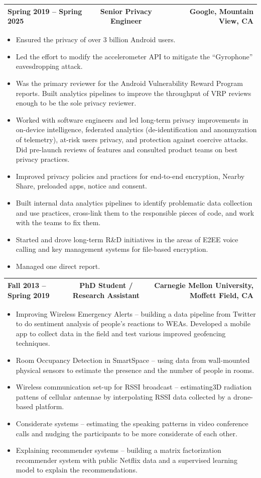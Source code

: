 \documentclass{res}
\makeatletter
\newcommand{\ExperienceHeader}[3]{%
  \Needspace{9\baselineskip}%
  \par\vspace{0.35ex}%
  \noindent
  \begin{tabular*}{\textwidth}{@{}l@{\extracolsep{\fill}}c@{\extracolsep{\fill}}r@{}}
    #1 & \textbf{#2} & #3 \\[-0.2ex]
    \hline
  \end{tabular*}%
  \par\nopagebreak[4]\vspace{0.35ex}\nopagebreak[4]%
}
\makeatother
\begin{document}
\begin{resume}
\ExperienceHeader{Spring 2019 -- Spring 2025}{Senior Privacy Engineer}{Google, Mountain View, CA}
\begin{itemize}
	\item
		Ensured the privacy of over 3 billion Android users.
	\item
		Led the effort to modify the accelerometer API to mitigate the ``Gyrophone'' eavesdropping attack.
	\item
		Was the primary reviewer for the Android Vulnerability Reward Program reports. Built analytics pipelines to improve the throughput of VRP reviews enough to be the sole privacy reviewer.
	\item
		Worked with software engineers and led long-term privacy improvements in on-device intelligence, federated analytics (de-identification and anonmyzation of telemetry), at-risk users privacy, and protection against coercive attacks. Did pre-launch reviews of features and consulted product teams on best privacy practices.
	\item
		Improved privacy policies and practices for end-to-end encryption, Nearby Share, preloaded apps, notice and consent.
	\item
		Built internal data analytics pipelines to identify problematic data collection and use practices, cross-link them to the responsible pieces of code, and work with the teams to fix them.
	\item
		Started and drove long-term R\&D initiatives in the areas of E2EE voice calling and key management systems for file-based encryption.
	\item
		Managed one direct report.
\end{itemize}

\ExperienceHeader{Fall 2013 -- Spring 2019}{PhD Student / Research Assistant}{Carnegie Mellon University, Moffett Field, CA}
\begin{itemize}
	\item
		Improving Wireless Emergency Alerts -- building a data pipeline from Twitter to do sentiment analysis of people's reactions to WEAs. Developed a mobile app to collect data in the field and test various improved geofencing techniques.
	\item
		Room Occupancy Detection in SmartSpace -- using data from wall-mounted physical sensors to estimate the presence and the number of people in rooms.
	\item
		Wireless communication set-up for RSSI broadcast -- estimating3D radiation pattens of cellular antennae by interpolating RSSI data collected by a drone-based platform.
	\item
		Considerate systems -- estimating the speaking patterns in video conference calls and nudging the participants to be more considerate of each other.
	\item
		Explaining recommender systems -- building a matrix factorization recommender system with public Netflix data and a supervised learning model to explain the recommendations.
\end{itemize}


\end{resume}
\end{document}
